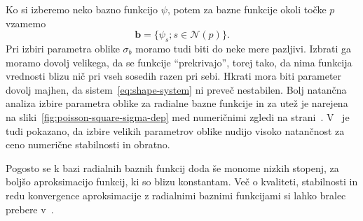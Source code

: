 \documentclass[12pt,a4paper,twoside]{article}
\theoremstyle{definition} %
\theoremstyle{plain} %
\numberwithin{equation}{section}
\newcommand{\Nc}{\mathcal{N}}
\renewcommand{\b}{\boldsymbol}
\begin{document}
Ko si izberemo neko bazno funkcijo $\psi$, potem za bazne funkcije okoli točke
$p$ vzamemo
\[
  \b b = \{\psi_s; s \in \Nc(p) \}.
\]
Pri izbiri parametra oblike $\sigma_b$ moramo tudi biti do neke mere pazljivi. Izbrati
ga moramo dovolj velikega, da se funkcije ``prekrivajo'', torej tako, da nima
funkcija vrednosti blizu nič pri vseh sosedih razen pri sebi. Hkrati mora biti
parameter dovolj majhen, da sistem~\eqref{eq:shape-system} ni preveč nestabilen.
Bolj natančna analiza izbire parametra oblike za radialne bazne funkcije in
za utež je narejena na sliki~\ref{fig:poisson-square-sigma-dep} med numeričnimi
zgledi na strani~\pageref{fig:poisson-square-sigma-dep}. V~\cite{schaback1997efficiency} je tudi
pokazano, da izbire velikih parametrov oblike nudijo visoko natančnost za ceno numerične stabilnosti
in obratno.

Pogosto se k bazi radialnih baznih funkcij doda še monome nizkih stopenj, za
boljšo aproksimacijo funkcij, ki so blizu konstantam. Več o kvaliteti,
stabilnosti in redu konvergence aproksimacije z radialnimi baznimi funkcijami
si lahko bralec prebere v~\cite{buhmann2000radial}.
\end{document}

